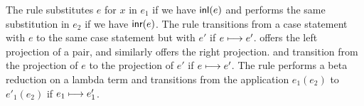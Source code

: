 The  rule substitutes $e$ for $x$ in $e_1$ if we have $\textsf{inl}(e)$ 
and  performs the same substitution in $e_2$ if we have $\textsf{inr}(e)$. 
The  rule transitions from a case statement with $e$ to the same case statement 
but with $e'$ if $e \longmapsto e'$.  offers the left projection of a pair, 
and similarly  offers the right projection.  and 
 transition from the projection of $e$ to the projection of $e'$ if 
$e \longmapsto e'$. The  rule performs a beta reduction on a lambda term and 
 transitions from the application $e_1 (e_2)$ to $e'_1 (e_2)$ if 
$e_1 \longmapsto e'_1$.


